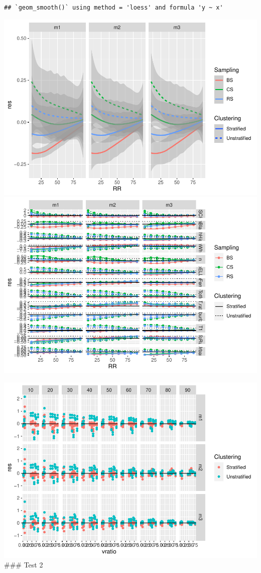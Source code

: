 \documentclass[
  english,
  man,floatsintext]{apa6}
\begin{document}
\begin{verbatim}
## `geom_smooth()` using method = 'loess' and formula 'y ~ x'
\end{verbatim}

\includegraphics{5---Analysis_files/figure-latex/unnamed-chunk-22-1.pdf} \includegraphics{5---Analysis_files/figure-latex/unnamed-chunk-22-2.pdf}

\includegraphics{5---Analysis_files/figure-latex/unnamed-chunk-23-1.pdf}
\#\#\# Test 2
\end{document}

